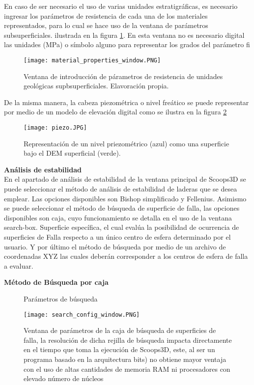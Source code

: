 En caso de ser necesario el uso de varias unidades estratigr\'{a}ficas, es necesario ingresar
los par\'{a}metros de resistencia de cada una de los materiales representados, para lo cual se
hace uso de la ventana de par\'{a}metros subsuperficiales. ilustrada en la figura \ref{fig:parameters}. En esta ventana no es necesario  digital las unidades (MPa) o s\'imbolo alguno para representar los grados del par\'ametro  fi \\

\begin{figure}[H]
\centering
\texttt{[image: material\_properties\_window.PNG]}
\caption{Ventana de introducci\'on de p\'arametros de resistencia de unidades geol\'ogicas supbsuperficiales. Elavoraci\'on propia.}
\label{fig:parameters}
\end{figure}


De la misma manera, la cabeza piezom\'{e}trica o nivel fre\'{a}tico se puede representar por
medio de un modelo de elevaci\'{o}n digital como se ilustra en la figura \ref{modelo piezometrico}
\\


\begin{figure}[H]
\centering
\texttt{[image: piezo.JPG]}
\caption{Representaci\'on de un nivel priezom\'etrico (azul) como una superficie bajo el DEM superficial (verde).}
\label{modelo piezometrico}
\end{figure}

\textbf{An\'{a}lisis de estabilidad}\\
En el apartado de an\'{a}lisis de estabilidad de la ventana principal de Scoops3D se puede
seleccionar el m\'{e}todo de an\'{a}lisis de estabilidad de laderas que se desea emplear. Las
opciones disponibles son Bishop simplificado y Fellenius.
Asimismo se puede seleccionar el m\'{e}todo de b\'{u}squeda de superficie de falla, las opciones
disponibles son caja, cuyo funcionamiento se detalla en el uso de la ventana search-box.
Superficie espec\'{i}fica, el cual eval\'{u}a la posibilidad de ocurrencia de superficies de Falla
respecto a un \'{u}nico centro de esfera determinado por el usuario. Y por \'{u}ltimo el m\'{e}todo de
b\'usqueda por medio de un archivo de coordenadas XYZ las cuales deber\'an corresponder a
los centros de esfera de falla a evaluar.\par

\textbf{M\'{e}todo de B\'{u}squeda por caja}\\

\begin{figure}[H]
\caption{Par\'{a}metros de b\'{u}squeda}
\centering
\texttt{[image: search\_config\_window.PNG]}
\caption{Ventana de par\'ametros de la caja de b\'usqueda de superficies de falla, la resoluci\'on de dicha rejilla de b\'usqueda impacta directamente en el tiempo que toma la ejecuci\'on de Scoops3D, este, al ser un programa basado en la arquitectura  bits) no obtiene mayor ventaja con el uso de altas cantidades de memoria RAM ni procesadores con elevado n\'umero de n\'ucleos}
\label{searchbox parameters}
\end{figure}


